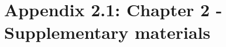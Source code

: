 \chapter[Appendix 2.1: Chapter 2 - Supplementary materials]{Appendix 2.1: Chapter 2 - Supplementary materials}\label{ch:Appendix2.1}

\renewcommand{\thefigure}{A.2.1.\arabic{figure}}
\setcounter{figure}{0}

\renewcommand{\thetable}{A.2.1.\arabic{table}}
\setcounter{table}{0}


